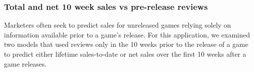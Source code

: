 \documentclass[letterpaper]{article}
\begin{document}



\subsubsection{Total and net 10 week sales vs pre-release reviews}
Marketers often seek to predict sales for unreleased games relying solely on information available prior to a game's release. For this application, we examined two models that used reviews only in the 10 weeks prior to the release of a game to predict either lifetime sales-to-date or net sales over the first 10 weeks after a game releases.
\end{document}
